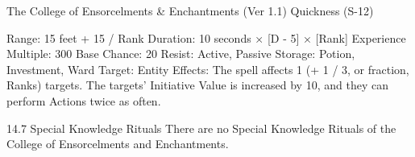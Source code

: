 \begin{Chapter}{The College of Ensorcelments \& Enchantments (Ver 1.1)}
Quickness (S-12) 

Range: 15 feet + 15 / Rank 
Duration: 10 seconds × [D - 5] × [Rank] 
Experience Multiple: 300 
Base Chance: 20%
Resist: Active, Passive 
Storage: Potion, Investment, Ward 
Target: Entity 
Effects:  The  spell  affects  1  (+  1  /  3,  or  fraction, 
Ranks)  targets.  The  targets’  Initiative  Value  is 
increased  by  10,  and  they  can  perform  Actions 
twice as often. 

14.7 Special Knowledge Rituals 
There  are  no  Special  Knowledge  Rituals  of  the 
College of Ensorcelments and Enchantments. 
\end{Chapter}
